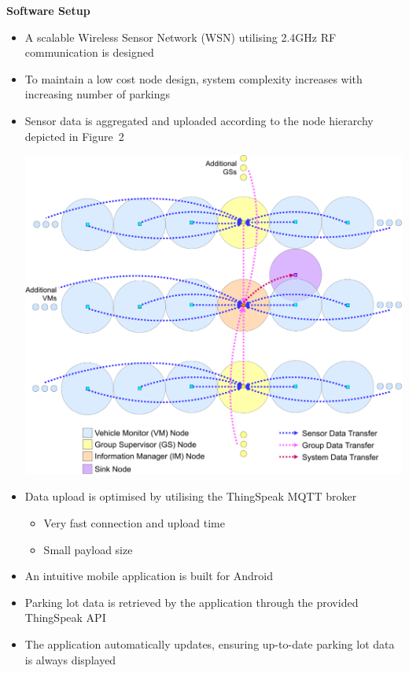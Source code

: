 \documentclass[landscape,a1paper,fontscale=0.47]{baposter} %
\newcommand{\compresslist}{ %
\setlength{\itemsep}{1pt}
\setlength{\parskip}{0pt}
\setlength{\parsep}{0pt}
}
\begin{document}
\begin{poster}
{\begin{multicols}{2}
		\textbf{Software Setup}
			\begin{itemize}[leftmargin=13pt]\compresslist
				\item A scalable Wireless Sensor Network (WSN) utilising 2.4GHz RF communication is designed
				\item To maintain a low cost node design, system complexity increases with increasing number of parkings
				\item Sensor data is aggregated and uploaded according to the node hierarchy depicted in Figure~2
				\begin{center}
					\includegraphics[width=0.85\columnwidth]{mesh-cropped}
				\end{center}
			\vspace{0.5mm}
				\item Data upload is optimised by utilising the ThingSpeak MQTT broker
					\begin{itemize}[leftmargin=13pt]\compresslist
						\item Very fast connection and upload time
						\item Small payload size
					\end{itemize}
				\item An intuitive mobile application is built for Android
				\item Parking lot data is retrieved by the application through the provided ThingSpeak API
				\item The application automatically updates, ensuring up-to-date parking lot data is always displayed 
			\end{itemize}
		

\end{multicols}}
\end{poster}
\end{document}
